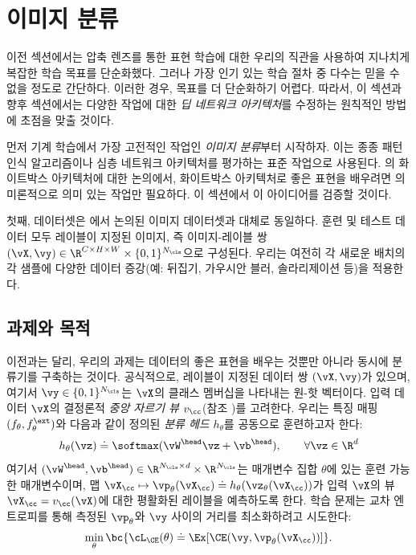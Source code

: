 \documentclass[../../book-main_ko.tex]{subfiles}
\begin{document}
\section{이미지 분류}\label{sec:image_classification}

이전 섹션에서는 압축 렌즈를 통한 표현 학습에 대한 우리의 직관을 사용하여 지나치게 복잡한 학습 목표를 단순화했다. 그러나 가장 인기 있는 학습 절차 중 다수는 믿을 수 없을 정도로 간단하다. 이러한 경우, 목표를 더 단순화하기 어렵다. 따라서, 이 섹션과 향후 섹션에서는 다양한 작업에 대한 \textit{딥 네트워크 아키텍처}를 수정하는 원칙적인 방법에 초점을 맞출 것이다.

먼저 기계 학습에서 가장 고전적인 작업인 \textit{이미지 분류}부터 시작하자. 이는 종종 패턴 인식 알고리즘이나 심층 네트워크 아키텍처를 평가하는 표준 작업으로 사용된다. 의 화이트박스 아키텍처에 대한 논의에서, 화이트박스 아키텍처로 좋은 표현을 배우려면 의미론적으로 의미 있는 작업만 필요하다. 이 섹션에서 이 아이디어를 검증할 것이다.

첫째, 데이터셋은 에서 논의된 이미지 데이터셋과 대체로 동일하다. 훈련 및 테스트 데이터 모두 레이블이 지정된 이미지, 즉 이미지-레이블 쌍 \((\vX, \vy) \in \R^{C \times H \times W} \times \{0, 1\}^{N_{\cls}}\)으로 구성된다. 우리는 여전히 각 새로운 배치의 각 샘플에 다양한 데이터 증강(예: 뒤집기, 가우시안 블러, 솔라리제이션 등)을 적용한다.

\subsection{과제와 목적}\label{sub:image_classification_objective}

이전과는 달리, 우리의 과제는 데이터의 좋은 표현을 배우는 것뿐만 아니라 동시에 분류기를 구축하는 것이다. 공식적으로, 레이블이 지정된 데이터 쌍 \((\vX, \vy)\)가 있으며, 여기서 \(\vy \in \{0, 1\}^{N_{\cls}}\)는 \(\vX\)의 클래스 멤버십을 나타내는 원-핫 벡터이다. 입력 데이터 \(\vX\)의 결정론적 \textit{중앙 자르기 뷰} \(v_{\cc}\)(참조 )를 고려한다. 우리는 특징 매핑 \((f_{\theta}, f_{\theta}^{\ext})\)와 다음과 같이 정의된 \textit{분류 헤드} \(h_{\theta}\)를 공동으로 훈련하고자 한다:
\begin{equation}
    h_{\theta}(\vz) \doteq \softmax(\vW^{\head}\vz + \vb^{\head}), \qquad  \forall \vz \in \R^{d}
\end{equation}
여기서 \((\vW^{\head}, \vb^{\head}) \in \R^{N_{\cls} \times d} \times \R^{N_{\cls}}\)는 매개변수 집합 \(\theta\)에 있는 훈련 가능한 매개변수이며, 맵 \(\vX_{\cc} \mapsto \vp_{\theta}(\vX_{\cc}) \doteq h_{\theta}(\vz_{\theta}(\vX_{\cc}))\)가 입력 \(\vX\)의 뷰 \(\vX_{\cc} = v_{\cc}(\vX)\)에 대한 평활화된 레이블을 예측하도록 한다. 학습 문제는 교차 엔트로피를 통해 측정된 \(\vp_{\theta}\)와 \(\vy\) 사이의 거리를 최소화하려고 시도한다:
\begin{equation}\label{eq:classification_ce_loss}
    \min_{\theta}\bc{\cL_{\CE}(\theta) \doteq \Ex[\CE(\vy, \vp_{\theta}(\vX_{\cc}))]}.
\end{equation}
\end{document}
